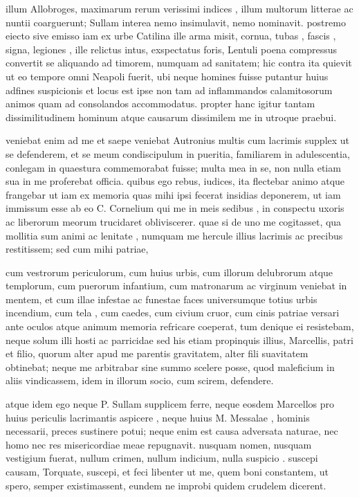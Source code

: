  illum Allobroges, maximarum rerum verissimi indices , illum multorum litterae ac nuntii coarguerunt; Sullam interea nemo insimulavit, nemo nominavit. postremo eiecto sive emisso iam ex urbe Catilina ille arma misit, cornua, tubas , fascis , signa, legiones , ille relictus intus, exspectatus foris, Lentuli poena compressus convertit se aliquando ad timorem, numquam ad sanitatem; hic contra ita quievit ut eo tempore omni Neapoli fuerit, ubi neque homines fuisse putantur huius adfines suspicionis et locus est ipse non tam ad inflammandos calamitosorum animos quam ad consolandos accommodatus. propter hanc igitur tantam dissimilitudinem hominum atque causarum dissimilem me in utroque praebui.

 veniebat enim ad me et saepe veniebat Autronius multis cum lacrimis supplex ut se defenderem, et se meum condiscipulum in pueritia, familiarem in adulescentia, conlegam in quaestura commemorabat fuisse; multa mea in se, non nulla etiam sua in me proferebat officia. quibus ego rebus, iudices, ita flectebar animo atque frangebar ut iam ex memoria quas mihi ipsi fecerat insidias deponerem, ut iam immissum esse ab eo C. Cornelium qui me in meis sedibus , in conspectu uxoris ac liberorum meorum trucidaret obliviscerer. quae si de uno me cogitasset, qua mollitia sum animi ac lenitate , numquam me hercule illius lacrimis ac precibus restitissem; sed cum mihi patriae,

 cum vestrorum periculorum, cum huius urbis, cum illorum delubrorum atque templorum, cum puerorum infantium, cum matronarum ac virginum veniebat in mentem, et cum illae infestae ac funestae faces universumque totius urbis incendium, cum tela , cum caedes, cum civium cruor, cum cinis patriae versari ante oculos atque animum memoria refricare coeperat, tum denique ei resistebam, neque solum illi hosti ac parricidae sed his etiam propinquis illius, Marcellis, patri et filio, quorum alter apud me parentis gravitatem, alter fili suavitatem obtinebat; neque me arbitrabar sine summo scelere posse, quod maleficium in aliis vindicassem, idem in illorum socio, cum scirem, defendere.

 atque idem ego neque P. Sullam supplicem ferre, neque eosdem Marcellos pro huius periculis lacrimantis aspicere , neque huius M. Messalae , hominis necessarii, preces sustinere potui; neque enim est causa adversata naturae, nec homo nec res misericordiae meae repugnavit. nusquam nomen, nusquam vestigium fuerat, nullum crimen, nullum indicium, nulla suspicio . suscepi causam, Torquate, suscepi, et feci libenter ut me, quem boni constantem, ut spero, semper existimassent, eundem ne improbi quidem crudelem dicerent.

